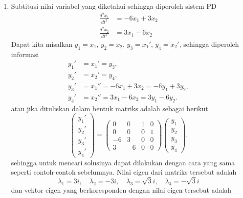 \documentclass[a4paper]{article}
\theoremstyle{definisi}
\numberwithin{equation}{section}
\begin{document}
\begin{enumerate}
    \item Subtitusi nilai variabel yang diketahui sehingga diperoleh sistem PD
    \begin{align*}
        \frac{d^2x_1}{dt^2}&=-6x_1+3x_2\\
        \frac{d^2x_2}{dt^2}&=3x_1-6x_2
    \end{align*}
    Dapat kita misalkan $y_1=x_1,\,y_2=x_2,\,y_3=x_1',\,y_4=x_2'$, sehingga diperoleh informasi
    \begin{align*}
        y_1'&=x_1'=y_3,\\
        y_2'&=x_2'=y_4,\\
        y_3'&=x_1''=-6x_1+3x_2=-6y_1+3y_2,\\
        y_4'&=x_2''=3x_1-6x_2=3y_1-6y_2.
    \end{align*}
    atau jika dituliskan dalam bentuk matriks adalah sebagai berikut
    \begin{equation*}
        \begin{pmatrix}
            y_1'\\
            y_2'\\
            y_3'\\
            y_4'
        \end{pmatrix}=\begin{pmatrix}
            0 & 0 & 1 & 0\\
            0 & 0 & 0 & 1\\
            -6 & 3 & 0 & 0\\
            3 & -6 & 0 & 0
        \end{pmatrix}\begin{pmatrix}
            y_1\\
            y_2\\
            y_3\\
            y_4
        \end{pmatrix}.
    \end{equation*}
    sehingga untuk mencari solusinya dapat dilakukan dengan cara yang sama seperti contoh-contoh sebelumnya. Nilai eigen dari matriks tersebut adalah
    \[\lambda_1 = 3i, \quad \lambda_2 = -3i, \quad \lambda_3 = \sqrt{3}i, \quad \lambda_4 = -\sqrt{3}i\]
    dan vektor eigen yang berkoresponden dengan nilai eigen tersebut adalah

\end{enumerate}
\end{document}
